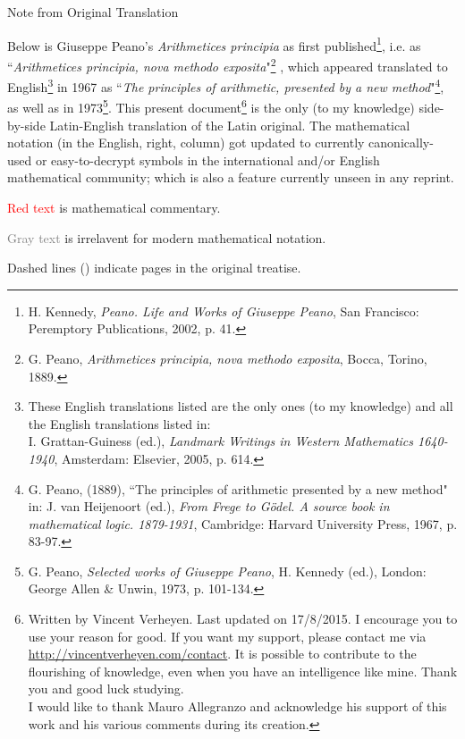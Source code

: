 \documentclass{book}
\newcommand\irrelavent[1]{\textcolor{gray}{#1}}
\begin{document}
%
\begin{paracol}{3}
  \switchcolumn[1] %

  { \Large Note from Original Translation}

   \vspace{0.25cm}
  
   Below is Giuseppe Peano's \emph{Arithmetices principia} as first published\footnote{H. Kennedy, \emph{Peano. Life and Works of Giuseppe Peano}, San Francisco: Peremptory Publications, 2002, p. 41.}, i.e. as ``\emph{Arithmetices principia, nova methodo exposita}"\footnote{G. Peano, \emph{Arithmetices principia, nova methodo exposita}, Bocca, Torino, 1889.} , which appeared translated to English\footnote{These English translations listed are the only ones (to my knowledge) and all the English translations listed in: \\
   I. Grattan-Guiness (ed.), \emph{Landmark Writings in Western Mathematics 1640-1940}, Amsterdam: Elsevier, 2005, p. 614.} in 1967 as ``\emph{The principles of arithmetic, presented by a new method}"\footnote{G. Peano, (1889), ``The principles of arithmetic presented by a new method" in: J. van Heijenoort (ed.), \emph{From Frege to G\"odel. A source book in mathematical logic. 1879-1931}, Cambridge: Harvard University Press, 1967, p. 83-97.}, as well as in 1973\footnote{G. Peano, \emph{Selected works of Giuseppe Peano}, H. Kennedy (ed.), London: George Allen \& Unwin, 1973, p. 101-134.}.
   This present document\footnote{Written by Vincent Verheyen. Last updated on 17/8/2015. I encourage you to use your reason for good. If you want my support, please contact me via \url{http://vincentverheyen.com/contact}. It is possible to contribute to the flourishing of knowledge, even when you have an intelligence like mine. Thank you and good luck studying. \\
   I would like to thank Mauro Allegranzo and acknowledge his support of this work and his various comments during its creation.} is the only (to my knowledge) side-by-side Latin-English translation of the Latin original.
   The mathematical notation (in the English, right, column) got updated to currently canonically-used or easy-to-decrypt symbols in the international and/or English mathematical community; which is also a feature currently unseen in any reprint.

   \vspace{1cm}
   
   \textcolor{red}{Red text} is mathematical commentary.

   \irrelavent{Gray text} is irrelavent for modern mathematical notation.

   Dashed lines (\hdashrule{2cm}{0.1mm}{0.1mm 1mm}) indicate pages in the original treatise.

   \vspace{1cm}
\end{paracol}
\newpage  
\end{document}
